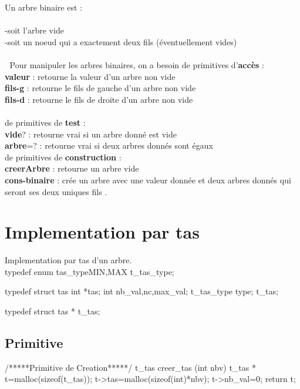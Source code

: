 \documentclass[a4paper,12pt,openany]{book}
\begin{document}
Un arbre binaire est :\\
\\
-soit l’arbre vide\\
-soit un noeud qui a exactement deux fils (éventuellement vides)\\
\\ 
Pour manipuler les arbres binaires, on a besoin de primitives d’\textbf{accès} : \\
\textbf{valeur} : retourne la valeur d’un arbre non vide\\
\textbf{fils-g} : retourne le fils de gauche d’un arbre non vide\\
\textbf{fils-d} : retourne le fils de droite d’un arbre non vide\\
\\
de primitives de \textbf{test} :\\
\textbf{vide}? : retourne vrai si un arbre donné est vide\\
\textbf{arbre}=? : retourne vrai si deux arbres donnés sont égaux\\

de primitives de \textbf{construction} :\\
\textbf{creerArbre} : retourne un arbre vide\\
\textbf{cons-binaire} : crée un arbre avec une valeur donnée et deux arbres donnés qui seront ses deux uniques fils .\\

\section{Implementation par tas}

Implementation par tas d'un arbre.\\

typedef enum tas_type{MIN,MAX} t_tas_type;

typedef struct tas{
  int *tas;
  int nb_val,nc,max_val;
  t_tas_type type;
}t_tas;

typedef struct tas * t_tas;

\subsection{Primitive}

/*****Primitive de Creation*****/
t_tas creer_tas (int nbv){
  t_tas * t=malloc(sizeof(t_tas));
  t->tas=malloc(sizeof(int)*nbv);
  t->nb_val=0;
  return t;
}
\end{document}
